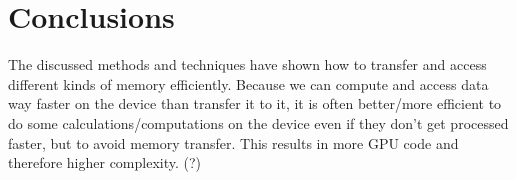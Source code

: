 \section{Conclusions}
\label{sec:concl}
The discussed methods and techniques have shown how to transfer and access different kinds of memory efficiently.
Because we can compute and access data way faster on the device than transfer it to it, it is often better/more efficient
to do some calculations/computations on the device even if they don't get processed faster, but to avoid memory transfer.
This results in more GPU code and therefore higher complexity. (?)

